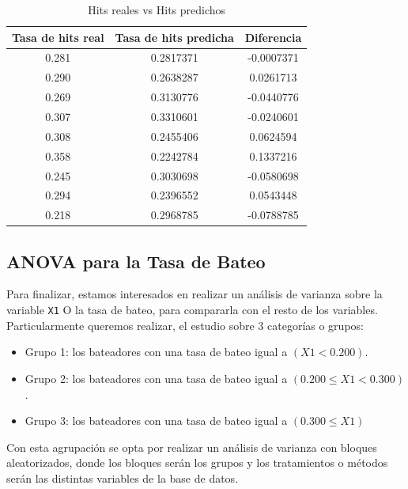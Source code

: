 \documentclass{staprojteamusb}
\providecommand{\tightlist}{%
	\setlength{\itemsep}{0pt}\setlength{\parskip}{0pt}}
\begin{document}
 \begin{table}[h]

 \caption{\label{tab:prediccion}Hits reales vs Hits predichos}
 \centering
 \begin{tabular}[t]{c|c|c}
 \hline
 Tasa de hits real  &  Tasa de hits predicha  &  Diferencia \\
 \hline
 0.281 & 0.2817371 & -0.0007371\\
 \hline
 0.290 & 0.2638287 & 0.0261713\\
 \hline
 0.269 & 0.3130776 & -0.0440776\\
 \hline
 0.307 & 0.3310601 & -0.0240601\\
 \hline
 0.308 & 0.2455406 & 0.0624594\\
 \hline
 0.358 & 0.2242784 & 0.1337216\\
 \hline
 0.245 & 0.3030698 & -0.0580698\\
 \hline
 0.294 & 0.2396552 & 0.0543448\\
 \hline
 0.218 & 0.2968785 & -0.0788785\\
 \hline
 \end{tabular}
 \end{table}

 \hypertarget{anova-para-la-tasa-de-bateo}{%
 \subsection{ANOVA para la Tasa de Bateo}\label{anova-para-la-tasa-de-bateo}}

 Para finalizar, estamos interesados en realizar un análisis de varianza sobre la variable \texttt{X1} O la tasa de bateo, para compararla con el resto de los variables. Particularmente queremos realizar, el estudio sobre \(3\) categorías o grupos:

 \begin{itemize}
 \tightlist
 \item
   Grupo 1: los bateadores con una tasa de bateo igual a \((X1<0.200)\).
 \item
   Grupo 2: los bateadores con una tasa de bateo igual a \((0.200\leq X1 < 0.300)\).
 \item
   Grupo 3: los bateadores con una tasa de bateo igual a \((0.300\leq X1)\)
 \end{itemize}

 Con esta agrupación se opta por realizar un análisis de varianza con bloques aleatorizados, donde los bloques serán los grupos y los tratamientos o métodos serán las distintas variables de la base de datos.
\end{document}
